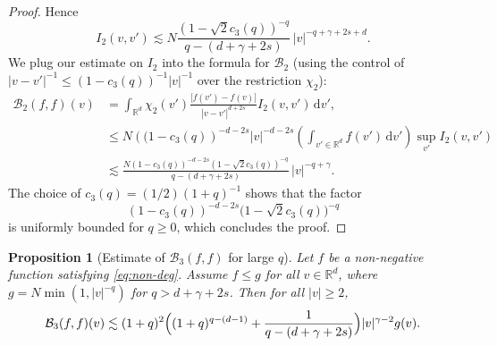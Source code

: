 \documentclass[JEP,XML,SOM,Unicode,NoFloatCountersInSection]{cedram}
\theoremstyle{plain}
\newtheorem{prop}[thm]{Proposition}
\theoremstyle{definition}
\numberwithin{equation}{section}
\newcommand{\R}{\mathbb R}
\newcommand{\dd} {\, \mathrm{d}}
\let\A N
\begin{document}
\begin{proof}
Hence
\[
I_2(v,v') \lesssim \A \frac{\left(1-\sqrt 2 c_3(q)\right)^{-q}}{q-(d+\gamma + 2s)}\, |v|^{-q+\gamma+2s +d}.
\]
We plug our estimate on $I_2$ into the formula for $\mathcal B_2$
(using the control of $|v-v'|^{-1} \le (1-c_3(q))^{-1} |v|^{-1}$ over the
restriction $\chi_2$):
\begin{align*}
\mathcal{B}_2 (f,f)(v) &= \int_{\R^d} \chi_2(v')
\frac{\big[f(v')-f(v)\big]}{|v-v'|^{d+2s}} I_2(v,v') \dd v', \\
&\leq \A \left((1-c_3(q)\right)^{-d-2s} |v|^{-d-2s} \left( \int_{v'\in \R^d} f(v') \dd
v'\right) \sup_{v'} I_2(v,v') \\
& \lesssim \frac{\A \left(1-c_3(q)\right)^{-d-2s} \left(1-\sqrt{2}c_3(q)\right)^{-q}}{q-(d+\gamma + 2s)}\, |v|^{-q+\gamma}.
\end{align*}
The choice of
$c_3(q) = (1/2)(1+q)^{-1}$ shows that the factor
\[
\left(1-c_3(q)\right)^{-d-2s} \bigl(1-\sqrt{2}c_3(q)\bigr)^{-q}
\]
is
uniformly bounded for $q \ge 0$, which concludes the proof.
\end{proof}

\begin{prop}[Estimate of $\mathcal{B}_3(f,f)$ for large $q$] \label{prop:B3} Let $f$ be a non-negative function satisfying \eqref{eq:non-deg}. Assume $f \leq g$ for all $v \in \R^d$, where {$g = \A \min(1,|v|^{-q})$} for
$q> d+\gamma +2s$. Then for all $|v| \ge 2$,
\[ \mathcal{B}_3 (f,f)(v) \lesssim (1+q)^2 \Bigl( (1+q)^{q-(d-1)} +
\frac{1}{q-(d+\gamma+2s)} \Bigr) |v|^{\gamma -2} g(v).\]
\end{prop}
\end{document}
